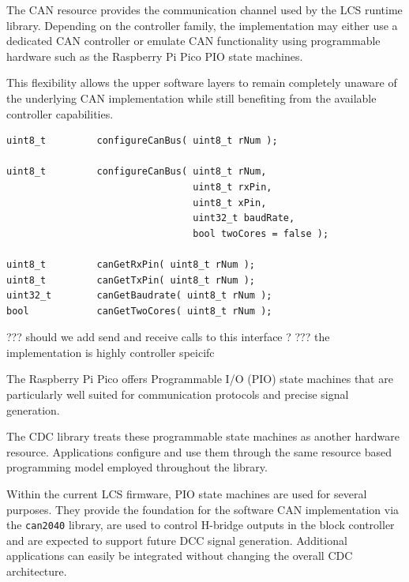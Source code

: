 
The CAN resource provides the communication channel used by the LCS runtime
library. Depending on the controller family, the implementation may either use a
dedicated CAN controller or emulate CAN functionality using programmable
hardware such as the Raspberry Pi Pico PIO state machines.

This flexibility allows the upper software layers to remain completely unaware
of the underlying CAN implementation while still benefiting from the available
controller capabilities.

\lstset{language=c++, style=api-interface}
\begin{lstlisting}
uint8_t         configureCanBus( uint8_t rNum );

uint8_t         configureCanBus( uint8_t rNum, 
                                 uint8_t rxPin, 
                                 uint8_t xPin, 
                                 uint32_t baudRate, 
                                 bool twoCores = false );
                                 
uint8_t         canGetRxPin( uint8_t rNum );
uint8_t         canGetTxPin( uint8_t rNum );
uint32_t        canGetBaudrate( uint8_t rNum );
bool            canGetTwoCores( uint8_t rNum );
\end{lstlisting}
\FloatBarrier

??? should we add send and receive calls to this interface ?
??? the implementation is highly controller speicifc


The Raspberry Pi Pico offers Programmable I/O (PIO) state machines that are 
particularly well suited for communication protocols and precise signal generation.

The CDC library treats these programmable state machines as another hardware
resource. Applications configure and use them through the same resource based
programming model employed throughout the library.

Within the current LCS firmware, PIO state machines are used for several
purposes. They provide the foundation for the software CAN implementation via
the \texttt{can2040} library, are used to control H-bridge outputs in the block
controller and are expected to support future DCC signal generation. Additional
applications can easily be integrated without changing the overall CDC
architecture.

